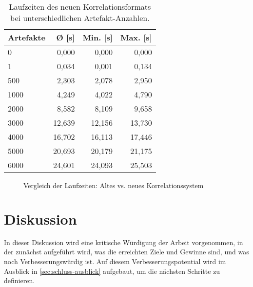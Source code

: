 \begin{table}[h!]
    \centering
    \begin{tabular}{l r r r}
        \toprule
        \textbf{Artefakte} & \textbf{Ø [s]} & \textbf{Min. [s]} & \textbf{Max. [s]} \\
        \midrule
        0                  & 0,000          & 0,000             & 0,000             \\
        1                  & 0,034          & 0,001             & 0,134             \\
        500                & 2,303          & 2,078             & 2,950             \\
        1000               & 4,249          & 4,022             & 4,790             \\
        2000               & 8,582          & 8,109             & 9,658             \\
        3000               & 12,639         & 12,156            & 13,730            \\
        4000               & 16,702         & 16,113            & 17,446            \\
        5000               & 20,693         & 20,179            & 21,175            \\
        6000               & 24,601         & 24,093            & 25,503            \\
        \bottomrule
    \end{tabular}
    \caption{Laufzeiten des neuen Korrelationsformats bei unterschiedlichen Artefakt-Anzahlen.}
    \label{tab:new-correlation-performance}
\end{table}

\begin{figure}[htbp]
    \centering
    \makebox[\textwidth]{}
    \caption{Vergleich der Laufzeiten: Altes vs. neues Korrelationssystem}
    \label{fig:correlation-performance-comparison}
\end{figure}


\section{Diskussion}

In dieser Diskussion wird eine kritische Würdigung der Arbeit vorgenommen, in der zunächst aufgeführt wird, was die erreichten Ziele und Gewinne sind, und was noch Verbesserungswürdig ist.
Auf diesem Verbesserungspotential wird im Ausblick in \autoref{sec:schluss-ausblick} aufgebaut, um die nächsten Schritte zu definieren.

